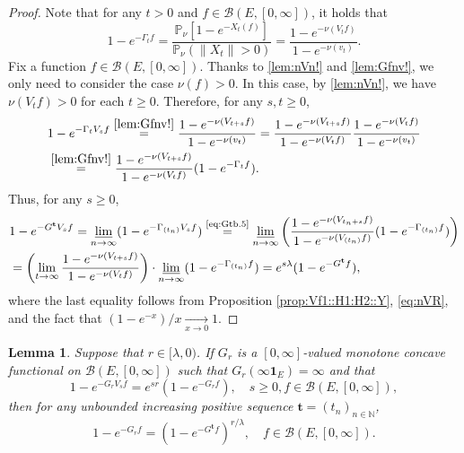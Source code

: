 \documentclass[12pt,a4paper]{amsart}
\numberwithin{equation}{section}
\theoremstyle{plain}
\newtheorem{lem}[thm]{Lemma}
\theoremstyle{definition}
\theoremstyle{remark}
\begin{document}
\begin{proof}
	Note that for any $t>0$ and $f\in \mathcal B(E,[0,\infty])$, it holds that
\begin{equation}\label{lem:Gfnv!}
	1 - e^{- \Gamma_t f}
	= \frac{ \mathbb P_\nu [ 1 - e^{- X_t(f)}]}{ \mathbb P_\nu (\|X_t\| > 0)}
	= \frac{ 1 - e^{- \nu(V_tf)} }{ 1 - e^{- \nu(v_t)}}.
\end{equation}
	Fix a function $f\in \mathcal B(E,[0,\infty])$.
	Thanks to \eqref{lem:nVn!} and \eqref{lem:Gfnv!}, we only need to consider the case $\nu(f) > 0$.
	In this case, by \eqref{lem:nVn!}, we have $\nu(V_tf)>0$ for each $t\geq 0$.
	Therefore, for any $s,t\geq 0$,
\begin{align}
	& 1 - e^{- \Gamma_t V_s f}
	\overset{\eqref{lem:Gfnv!}}= \frac{ 1 - e^{- \nu(V_{t+s} f)} }{ 1 - e^{- \nu(v_t)}}
	= \frac{ 1 - e^{- \nu(V_{t+s} f)} }{ 1 - e^{- \nu(V_tf)}} \frac{ 1 - e^{ - \nu(V_tf)}}{ 1 - e^{- \nu(v_t)}}
	\\ &  \label{eq:Gtb.5}\overset{\eqref{lem:Gfnv!}}= \frac{ 1 - e^{- \nu(V_{t+s} f)} }{ 1 - e^{- \nu(V_tf)}} ( 1 - e^{- \Gamma_t f}).
\end{align}
	Thus, for any $s\geq 0$,
\begin{align}
	& 1 - e^{- G^{\mathbf t} V_s f}
	= \varliminf_{n\to \infty} ( 1 - e^{- \Gamma_{(t_n)} V_s f})
	\overset{\text{\eqref{eq:Gtb.5}}}= \varliminf_{n\to \infty} \left( \frac{ 1 - e^{- \nu(V_{t_n+s}f)}}{ 1 - e^{- \nu(V_{(t_n)}f)}} (1 - e^{- \Gamma_{(t_n)} f}) \right)
	\\& = \left( \lim_{t \to \infty} \frac{ 1 - e^{- \nu(V_{t+s}f)}}{ 1 - e^{- \nu(V_{t}f)}} \right) \cdot \varliminf_{n\to \infty} (1 - e^{- \Gamma_{(t_n)} f} )
	= e^{s\lambda} (1 - e^{- G^{\mathbf t}f}),
\end{align}
	where the last equality follows from Proposition \ref{prop:Vf1::H1:H2::Y}, \eqref{eq:nVR}, and the fact that
	$
	(1-e^{-x}) /x \xrightarrow[x\to 0]{} 1.
	$
\end{proof}

\begin{lem} \label{prop:G*:H1:H2:H3:H4}
	Suppose that $r \in [\lambda,0)$.
	If $G_r$ is a $[0,\infty]$-valued monotone concave functional on $\mathcal B(E,[0,\infty])$
	such that $G_r(\infty \mathbf 1_E) = \infty$ and that
\begin{equation}
	1 - e^{-G_r V_s f}
	= e^{s r} (1 - e^{- G_r f}),
	\quad s\geq 0, f\in \mathcal B(E,[0,\infty]),
\end{equation}
	then for any unbounded increasing positive sequence $\mathbf t = (t_n)_{n\in \mathbb N}$,
\begin{equation}
	1 - e^{-G_r f} = (1 - e^{- G^\mathbf t f})^{r/\lambda}, \quad f \in \mathcal B(E,[0,\infty]).
\end{equation}
\end{lem}
\end{document}
